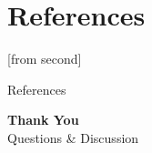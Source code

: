 \documentclass[10pt]{beamer}
\begin{document}
\section{References}

{[from second]
\begin{frame}[allowframebreaks]{References}
\tiny
\def\newblock{}
\nocite{*}


\end{frame}
}


\begin{frame}
    \centering
    \vspace{2cm}
    {\Huge \textbf{Thank You}}\\[12pt]
    {\large Questions \& Discussion}
\end{frame}
\end{document}
